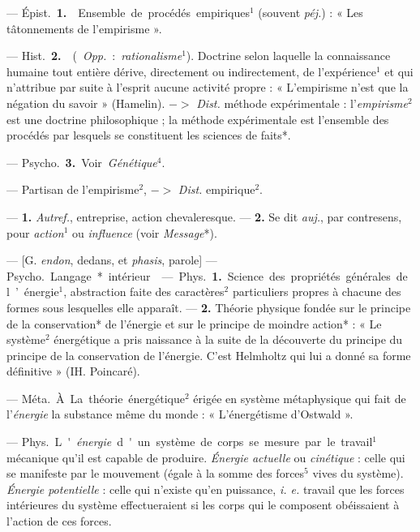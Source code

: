 \begin{itemize}[leftmargin=1cm, label=, itemsep=1pt]
 — \si{Épist.} {\bf 1.}  Ensemble de
procédés empiriques$^1$ (souvent  {\it péj.}) :
« Les tâtonnements de l’empirisme ».

— \si{Hist.} {\bf 2.}  ({\it Opp.}: {\it rationalisme}$^1$).
Doctrine selon laquelle la connaissance humaine tout entière dérive,
directement ou indirectement, de
l'expérience$^1$ et qui n’attribue par
suite à l'esprit aucune activité propre : « L’empirisme n’est que la
négation du savoir » (Hamelin).
$->$ {\it Dist.} méthode expérimentale : l'{\it empirisme}$^2$ est
une doctrine philosophique ; la méthode expérimentale est l'ensemble
des procédés par lesquels se constituent les sciences de faits*.

— \si{Psycho.} {\bf 3.} Voir {\it Génétique}$^4$.

 — Partisan de l'empirisme$^2$, $->$ {\it Dist.} empirique$^2$.

 — {\bf 1.} {\it Autref.}, entreprise, action chevaleresque. —
{\bf 2.} Se dit {\it auj.}, par contresens, pour {\it action}$^1$ ou {\it
influence} (voir {\it Message}*).

 — [G. {\it endon}, dedans, et {\it phasis}, parole]
— \si{Psycho.} Langage* intérieur.

 — \si{Phys.} {\bf 1.} Science des
propriétés générales de l’énergie$^1$,
abstraction faite des caractères$^2$
particuliers propres à chacune des
formes sous lesquelles elle apparaît.
— {\bf 2.} Théorie physique fondée sur
le principe de la conservation* de
l'énergie et sur le principe de moindre
action* : « Le système$^2$ énergétique
a pris naissance à la suite de la
découverte du principe du principe
de la conservation de l'énergie. C’est
Helmholtz qui lui a donné sa forme
définitive » (IH. Poincaré).

 — \si{Méta.} À La théorie
énergétique$^2$ érigée en système métaphysique qui fait de l'{\it énergie}
la substance même du monde : « L’énergétisme d'Ostwald ».

 — \si{Phys.} L'{\it énergie} d'un système de corps se mesure
par le travail$^1$ mécanique qu’il est capable
de produire. {\it Énergie actuelle} ou
{\it cinétique} : celle qui se manifeste par
le mouvement (égale à la somme
des forces$^5$ vives du système).
{\it Énergie potentielle} : celle qui n'existe
qu’en puissance, {\it i. e.} travail que les
forces intérieures du système effectueraient si les corps qui le composent obéissaient à l'action de ces
forces.


\end{itemize}
